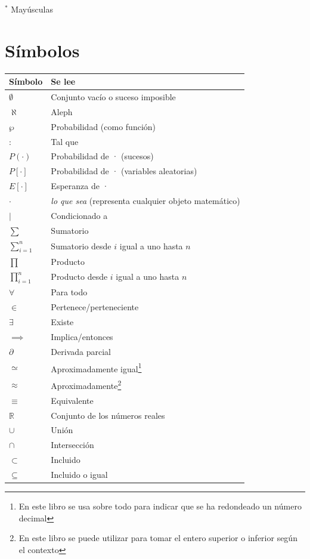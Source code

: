 \documentclass[
]{book}
\begin{document}
\(^*\) Mayúsculas

\hypertarget{suxedmbolos-1}{%
\section{Símbolos}\label{suxedmbolos-1}}

\begin{longtable}[]{@{}ll@{}}
\toprule
Símbolo & Se lee \\
\midrule
\endhead
\(\emptyset\) & Conjunto vacío o suceso imposible \\
\(\aleph\) & Aleph \\
\(\wp\) & Probabilidad (como función) \\
\(:\) & Tal que \\
\(P(\cdot)\) & Probabilidad de · (sucesos) \\
\(P[\cdot]\) & Probabilidad de · (variables aleatorias) \\
\(E[\cdot]\) & Esperanza de · \\
\(\cdot\) & \emph{lo que sea} (representa cualquier objeto matemático) \\
\(|\) & Condicionado a \\
\(\sum\) & Sumatorio \\
\(\sum\limits_{i=1}^n\) & Sumatorio desde \(i\) igual a uno hasta \(n\) \\
\(\prod\) & Producto \\
\(\prod\limits_{i=1}^n\) & Producto desde \(i\) igual a uno hasta \(n\) \\
\(\forall\) & Para todo \\
\(\in\) & Pertenece/perteneciente \\
\(\exists\) & Existe \\
\(\implies\) & Implica/entonces \\
\(\partial\) & Derivada parcial \\
\(\simeq\) & Aproximadamente igual\footnote{En este libro se usa sobre todo para indicar que se ha redondeado un número decimal} \\
\(\approx\) & Aproximadamente\footnote{En este libro se puede utilizar para tomar el entero superior o inferior según el contexto} \\
\(\equiv\) & Equivalente \\
\(\mathbb{R}\) & Conjunto de los números reales \\
\(\cup\) & Unión \\
\(\cap\) & Intersección \\
\(\subset\) & Incluido \\
\(\subseteq\) & Incluido o igual \\
\bottomrule
\end{longtable}
\end{document}

